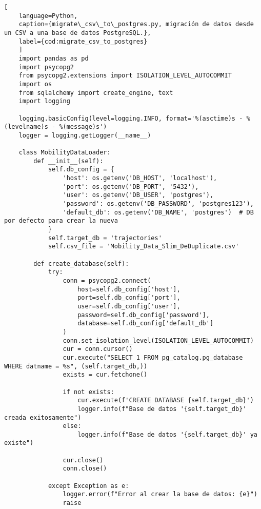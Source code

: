 \begin{lstlisting}[
    language=Python,
    caption={migrate\_csv\_to\_postgres.py, migración de datos desde un CSV a una base de datos PostgreSQL.},
    label={cod:migrate_csv_to_postgres}
    ]
    import pandas as pd
    import psycopg2
    from psycopg2.extensions import ISOLATION_LEVEL_AUTOCOMMIT
    import os
    from sqlalchemy import create_engine, text
    import logging

    logging.basicConfig(level=logging.INFO, format='%(asctime)s - %(levelname)s - %(message)s')
    logger = logging.getLogger(__name__)

    class MobilityDataLoader:
        def __init__(self):
            self.db_config = {
                'host': os.getenv('DB_HOST', 'localhost'),
                'port': os.getenv('DB_PORT', '5432'),
                'user': os.getenv('DB_USER', 'postgres'),
                'password': os.getenv('DB_PASSWORD', 'postgres123'),
                'default_db': os.getenv('DB_NAME', 'postgres')  # DB por defecto para crear la nueva
            }
            self.target_db = 'trajectories'
            self.csv_file = 'Mobility_Data_Slim_DeDuplicate.csv'
            
        def create_database(self):
            try:
                conn = psycopg2.connect(
                    host=self.db_config['host'],
                    port=self.db_config['port'],
                    user=self.db_config['user'],
                    password=self.db_config['password'],
                    database=self.db_config['default_db']
                )
                conn.set_isolation_level(ISOLATION_LEVEL_AUTOCOMMIT)
                cur = conn.cursor()
                cur.execute("SELECT 1 FROM pg_catalog.pg_database WHERE datname = %s", (self.target_db,))
                exists = cur.fetchone()
                
                if not exists:
                    cur.execute(f'CREATE DATABASE {self.target_db}')
                    logger.info(f"Base de datos '{self.target_db}' creada exitosamente")
                else:
                    logger.info(f"Base de datos '{self.target_db}' ya existe")
                    
                cur.close()
                conn.close()
                
            except Exception as e:
                logger.error(f"Error al crear la base de datos: {e}")
                raise
        

\end{lstlisting}
